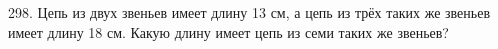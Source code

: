 298. Цепь из двух звеньев имеет длину 13 см, а цепь из трёх таких же звеньев имеет длину 18 см. Какую длину имеет цепь из семи таких же звеньев?\\
